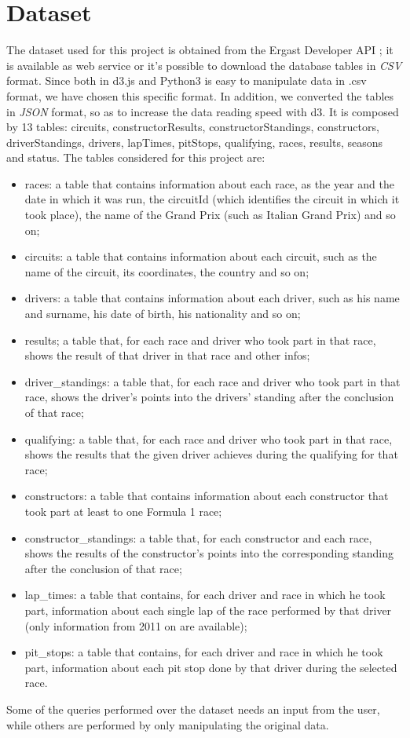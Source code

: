 \documentclass[11pt,twocolumn,letterpaper]{article}
\begin{document}
\section{Dataset}
The dataset used for this project is obtained from the Ergast Developer API \cite{Dataset}; it is available as web service or it's possible to download the database tables in \textit{CSV} format. Since both in d3.js \cite{D3} and Python3 is easy to manipulate data in .csv format, we have chosen this specific format. In addition, we converted the tables in \textit{JSON} format, so as to increase the data reading speed with d3. It is composed by 13 tables: circuits, constructorResults, constructorStandings, constructors, driverStandings, drivers, lapTimes, pitStops, qualifying, races, results, seasons and status. The tables considered for this project are:
\begin{itemize}
	\item races: a table that contains information about each race, as the year and the date in which it was run, the circuitId (which identifies the circuit in which it took place), the name of the Grand Prix (such as Italian Grand Prix) and so on;
	\item circuits: a table that contains information about each circuit, such as the name of the circuit, its coordinates, the country and so on;
	\item drivers: a table that contains information about each driver, such as his name and surname, his date of birth, his nationality and so on;
	\item results; a table that, for each race and driver who took part in that race, shows the result of that driver in that race and other infos;
	\item driver\_standings: a table that, for each race and driver who took part in that race, shows the driver's points into the drivers' standing after the conclusion of that race;
	\item qualifying: a table that, for each race and driver who took part in that race, shows the results that the given driver achieves during the qualifying for that race;
	\item constructors: a table that contains information about each constructor that took part at least to one Formula 1 race;
	\item constructor\_standings: a table that, for each constructor and each race, shows the results of the constructor's points into the corresponding standing after the conclusion of that race;
	\item lap\_times: a table that contains, for each driver and race in which he took part, information about each single lap of the race performed by that driver (only information from 2011 on are available);
	\item pit\_stops: a table that contains, for each driver and race in which he took part, information about each pit stop done by that driver during the selected race.
\end{itemize}
Some of the queries performed over the dataset needs an input from the user, while others are performed by only manipulating the original data.
\end{document}
